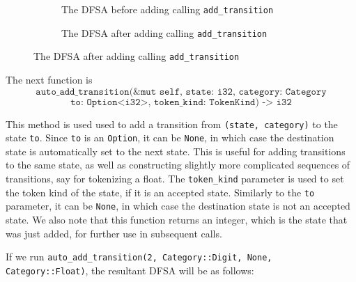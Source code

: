 \documentclass{article}
\newcommand{\code}[1]{\texttt{#1}}
\begin{document}
\begin{figure}[H]
    \begin{subfigure}[t]{0.5\textwidth}
        \centering
        \caption{The DFSA before adding calling \code{add\_transition}}
    \end{subfigure}
    \begin{subfigure}[t]{0.5\textwidth}
        \centering

        \caption{The DFSA after adding calling \code{add\_transition}}
    \end{subfigure}
\end{figure}

The next function is $$\code{auto\_add\_transition(\&mut self, state: i32,
        category: Category}$$
$$\code{to: Option<i32>, token\_kind: TokenKind) -> i32}$$

This method is used used to add a transition from \code{(state, category)} to
the state \code{to}. Since \code{to} is an \code{Option}, it can be \code{None},
in which case the destination state is automatically set to the next state. This
is useful for adding transitions to the same state, as well as constructing
slightly more complicated sequences of transitions, say for tokenizing a float.
The \code{token\_kind} parameter is used to set the token kind of the state, if
it is an accepted state. Similarly to the \code{to} parameter, it can be
\code{None}, in which case the destination state is not an accepted state.  We
also note that this function returns an integer, which is the state that was just added, for
further use in subsequent calls.

If we run \code{auto\_add\_transition(2, Category::Digit, None, Category::Float)}, the resultant DFSA will be as follows:
\end{document}
